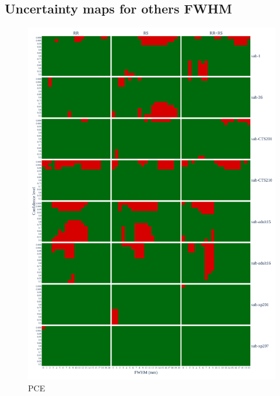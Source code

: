 \documentclass{article}
\begin{document}
\begin{appendices}
    \section{Uncertainty maps for others FWHM}

    \begin{figure}
        \centering
        \includegraphics[width=\linewidth]{figures/exclude_pce.pdf}
        \caption{PCE}
        \label{fig:loo_pce}
    \end{figure}


\end{appendices}
\end{document}
